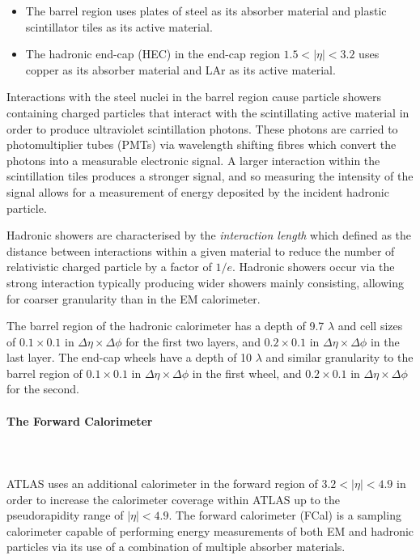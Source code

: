 \documentclass[12pt,a4paper,epsf,portrait,times,epsfig]{article}
\begin{document}
		\begin{itemize}
			\item The barrel region uses plates of steel as its absorber material and plastic scintillator tiles as its active material.
			\item The hadronic end-cap (HEC) in the end-cap region $1.5 < |\eta| < 3.2$ uses copper as its absorber material and LAr as its active material. 
		\end{itemize}

		Interactions with the steel nuclei in the barrel region cause particle showers containing charged particles that interact with the scintillating active material in order to produce ultraviolet scintillation photons. These photons are carried to photomultiplier tubes (PMTs) via wavelength shifting fibres which convert the photons into a measurable electronic signal. A larger interaction within the scintillation tiles produces a stronger signal, and so measuring the intensity of the signal allows for a measurement of energy deposited by the incident hadronic particle. \par

		Hadronic showers are characterised by the \textit{interaction length} which defined as the distance between interactions within a given material to reduce the number of relativistic charged particle by a factor of $1/e$. Hadronic showers occur via the strong interaction typically producing wider showers mainly consisting, allowing for coarser granularity than in the EM calorimeter. \par

		The barrel region of the hadronic calorimeter has a depth of 9.7 $\lambda$ and cell sizes of $0.1 \times 0.1$ in $\Delta\eta \times \Delta\phi$ for the first two layers, and $0.2 \times 0.1$ in $\Delta\eta \times \Delta\phi$ in the last layer. The end-cap wheels have a depth of 10 $\lambda$ and similar granularity to the barrel region of  $0.1 \times 0.1$ in $\Delta\eta \times \Delta\phi$ in the first wheel, and $0.2 \times 0.1$ in $\Delta\eta \times \Delta\phi$ for the second. 

		\paragraph{The Forward Calorimeter}\label{Section:FCal}
		\mbox{}\\
		\mbox{}\\

		ATLAS uses an additional calorimeter in the forward region of $3.2 < |\eta| < 4.9$ in order to increase the calorimeter coverage within ATLAS up to the pseudorapidity range of $|\eta| < 4.9$. The forward calorimeter (FCal) is a sampling calorimeter capable of performing energy measurements of both EM and hadronic particles via its use of a combination of multiple absorber materials. \par
		
\end{document}
